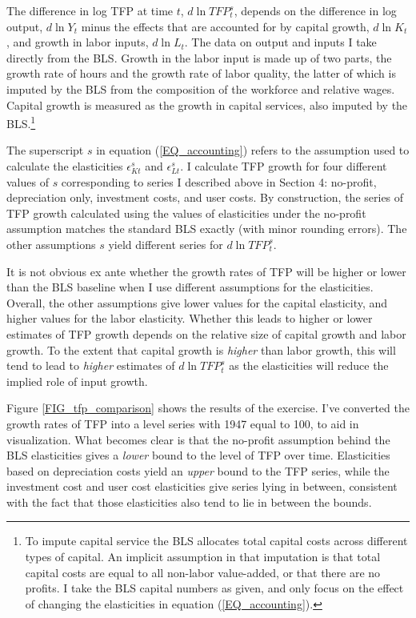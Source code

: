 \documentclass[11pt]{article}
\begin{document}
The difference in log TFP at time $t$, $d \ln TFP^s_t$, depends on the difference in log output, $d \ln Y_t$ minus the effects that are accounted for by capital growth, $d \ln K_t$, and growth in labor inputs, $d \ln L_t$. The data on output and inputs I take directly from the BLS. Growth in the labor input is made up of two parts, the growth rate of hours and the growth rate of labor quality, the latter of which is imputed by the BLS from the composition of the workforce and relative wages. Capital growth is measured as the growth in capital services, also imputed by the BLS.\footnote{To impute capital service the BLS allocates total capital costs across different types of capital. An implicit assumption in that imputation is that total capital costs are equal to all non-labor value-added, or that there are no profits. I take the BLS capital numbers as given, and only focus on the effect of changing the elasticities in equation (\ref{EQ_accounting}).}

The superscript $s$ in equation (\ref{EQ_accounting}) refers to the assumption used to calculate the elasticities $\epsilon^s_{Kt}$ and $\epsilon^s_{Lt}$. I calculate TFP growth for four different values of $s$ corresponding to series I described above in Section 4: no-profit, depreciation only, investment costs, and user costs. By construction, the series of TFP growth calculated using the values of elasticities under the no-profit assumption matches the standard BLS exactly (with minor rounding errors). The other assumptions $s$ yield different series for $d \ln TFP^s_t$.

It is not obvious ex ante whether the growth rates of TFP will be higher or lower than the BLS baseline when I use different assumptions for the elasticities. Overall, the other assumptions give lower values for the capital elasticity, and higher values for the labor elasticity. Whether this leads to higher or lower estimates of TFP growth depends on the relative size of capital growth and labor growth. To the extent that capital growth is \textit{higher} than labor growth, this will tend to lead to \textit{higher} estimates of $d \ln TFP^s_t$ as the elasticities will reduce the implied role of input growth. 

Figure \ref{FIG_tfp_comparison} shows the results of the exercise. I've converted the growth rates of TFP into a level series with 1947 equal to 100, to aid in visualization. What becomes clear is that the no-profit assumption behind the BLS elasticities gives a \textit{lower} bound to the level of TFP over time. Elasticities based on depreciation costs yield an \textit{upper} bound to the TFP series, while the investment cost and user cost elasticities give series lying in between, consistent with the fact that those elasticities also tend to lie in between the bounds. 
\end{document}
